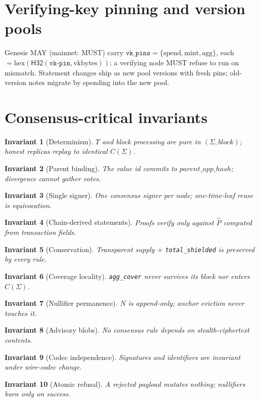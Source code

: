 \documentclass[10pt]{article}
\newtheorem{inv}{Invariant}
\newcommand{\ct}[1]{\texttt{#1}}
\newcommand{\Hs}{\mathsf{H32}}
\newcommand{\stx}{\ensuremath{\Sigma}}
\begin{document}
\section{Verifying-key pinning and version pools}\label{sec:pins}
Genesis MAY (mainnet: MUST) carry $\ct{vk\_pins} = \{\mathrm{spend}, \mathrm{mint}, \mathrm{agg}\}$, each $= \mathrm{hex}(\Hs(\ct{vk-pin}, \mathrm{vkbytes}))$; a verifying node MUST refuse to run on mismatch. Statement changes ship as new pool versions with fresh pins; old-version notes migrate by spending into the new pool.

\section{Consensus-critical invariants}
\begin{inv}[Determinism] $\Upsilon$ and block processing are pure in $(\stx, \mathit{block})$; honest replicas replay to identical $C(\stx)$. \end{inv}
\begin{inv}[Parent binding]\label{inv:parent} The value id commits to $\mathit{parent\_app\_hash}$; divergence cannot gather votes. \end{inv}
\begin{inv}[Single signer]\label{inv:single} One consensus signer per node; one-time-leaf reuse is equivocation. \end{inv}
\begin{inv}[Chain-derived statements]\label{inv:derived} Proofs verify only against $\hat P$ computed from transaction fields. \end{inv}
\begin{inv}[Conservation] Transparent supply $+$ \ct{total\_shielded} is preserved by every rule. \end{inv}
\begin{inv}[Coverage locality]\label{inv:cover} \ct{agg\_cover} never survives its block nor enters $C(\stx)$. \end{inv}
\begin{inv}[Nullifier permanence] $N$ is append-only; anchor eviction never touches it. \end{inv}
\begin{inv}[Advisory blobs]\label{inv:blob} No consensus rule depends on stealth-ciphertext contents. \end{inv}
\begin{inv}[Codec independence]\label{inv:codec} Signatures and identifiers are invariant under wire-codec change. \end{inv}
\begin{inv}[Atomic refusal] A rejected payload mutates nothing; nullifiers burn only on success. \end{inv}
\end{document}
